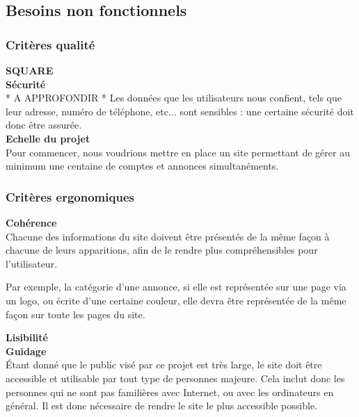 \documentclass[a4paper,11pt]{article}
\begin{document}
\subsection{Besoins non fonctionnels}

\subsubsection{Critères qualité}

\textbf{SQUARE}\\

\textbf{Sécurité}\\

* A APPROFONDIR *
Les données que les utilisateurs nous confient, tels que leur adresse, numéro de téléphone, etc... sont
sensibles : une certaine sécurité doit donc être assurée.\\

\textbf{Echelle du projet}\\

Pour commencer, nous voudrions mettre en place un site permettant de gérer au minimum une centaine de comptes et annonces simultanéments.

\subsubsection{Critères ergonomiques}

\textbf{Cohérence}\\

Chacune des informations du site doivent être présentés de la même façon à chacune de leurs apparitions, afin de le rendre plus compréhensibles pour l'utilisateur.

Par exemple, la catégorie d'une annonce, si elle est représentée sur une page via un logo, ou écrite d'une certaine couleur, elle devra être représentée de la même façon sur toute les pages du site.

\textbf{Lisibilité}\\

\textbf{Guidage}\\

Étant donné que le public visé par ce projet est très large, le site doit être accessible et utilisable par
tout type de personnes majeure. Cela inclut donc les personnes qui ne sont pas familières avec Internet, ou
avec les ordinateurs en général. Il est donc nécessaire de rendre le site le plus accessible possible.\\
\end{document}

